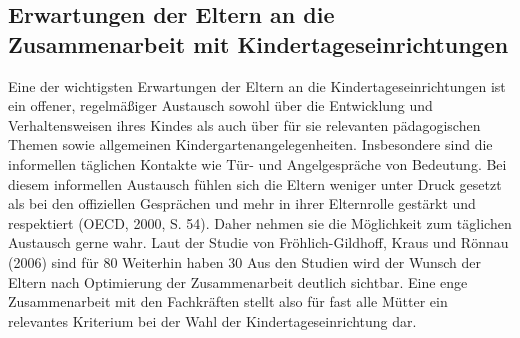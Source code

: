 \documentclass[12pt,a4paper]{article}
\begin{document}
\subsection{Erwartungen der Eltern an die Zusammenarbeit mit Kindertageseinrichtungen}  
Eine der wichtigsten Erwartungen der Eltern an die Kindertageseinrichtungen ist ein offener, regelmäßiger Austausch sowohl über die Entwicklung und Verhaltensweisen ihres Kindes als auch über für sie relevanten pädagogischen Themen sowie allgemeinen Kindergartenangelegenheiten. Insbesondere sind die informellen täglichen Kontakte wie Tür- und Angelgespräche von Bedeutung. Bei diesem informellen Austausch fühlen sich die Eltern weniger unter Druck gesetzt als bei den offiziellen Gesprächen und mehr in ihrer Elternrolle gestärkt und respektiert (OECD, 2000, S. 54). Daher nehmen sie die Möglichkeit zum täglichen Austausch gerne wahr. Laut der Studie von Fröhlich-Gildhoff, Kraus und Rönnau (2006) sind für 80%
Weiterhin haben 30%
Aus den Studien wird der Wunsch der Eltern nach Optimierung der Zusammenarbeit deutlich sichtbar. Eine enge Zusammenarbeit mit den Fachkräften stellt also für fast alle Mütter ein relevantes Kriterium bei der Wahl der Kindertageseinrichtung dar.
\end{document}
